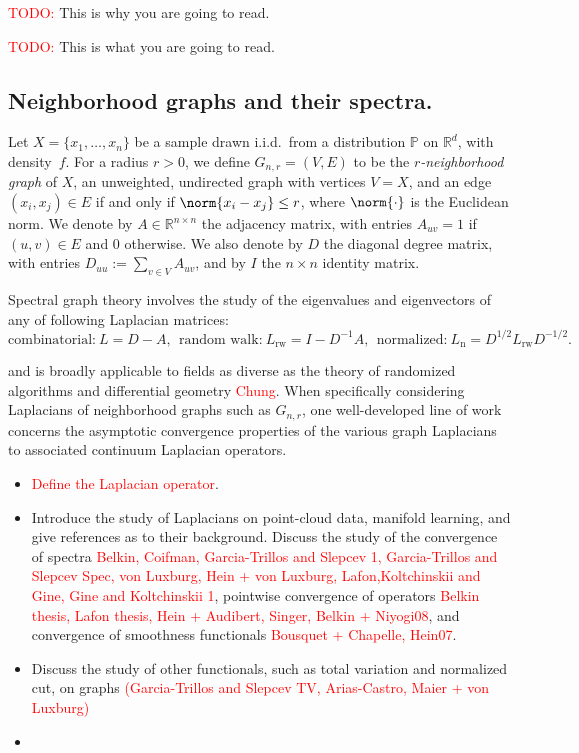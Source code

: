 \documentclass{article}
\newcommand{\Reals}{\mathbb{R}}
\newcommand{\1}{\mathbf{1}}
\newcommand{\Rd}{\Reals^d}
\newcommand{\Pbb}{\mathbb{P}}
\theoremstyle{alden}
\theoremstyle{aldenthm}
\theoremstyle{definition}
\theoremstyle{remark}
\begin{document}
\textcolor{red}{TODO:} This is why you are going to read.

\textcolor{red}{TODO:} This is what you are going to read.

\subsection{Neighborhood graphs and their spectra.}
\label{subsec:neighborhood_graphs_spectra}

Let $X = \{x_1,
\ldots, x_n\}$ be a sample drawn i.i.d.\ from a distribution $\Pbb$ on $\Rd$,
with density~$f$.  For a radius $r > 0$, we define $G_{n,r}=(V,E)$ to be the
\emph{$r$-neighborhood graph} of $X$, an unweighted, undirected graph with
vertices $V=X$, and an edge $(x_i,x_j) \in E$ if and only if $\norm{x_i -
	x_j} \leq r$, where $\norm{\cdot}$ is the Euclidean norm. We denote by $A \in
\Reals^{n \times n}$ the adjacency matrix, with entries $A_{uv} = 1$ if
$(u,v) \in E$ and $0$ otherwise.  We also denote by $D$ the diagonal degree
matrix, with entries $D_{uu} := \sum_{v \in V} A_{uv}$, and by $I$ the $n
\times n$ identity matrix.

Spectral graph theory involves the study of the eigenvalues and eigenvectors of any of following Laplacian matrices:
\begin{equation*}
\textrm{combinatorial:}~ L = D - A,~~ \textrm{random walk:}~ L_{\textrm{rw}} = I - D^{-1}A,~~ \textrm{normalized:}~ L_{\textrm{n}} = D^{1/2}L_{\textrm{rw}}D^{-1/2}.
\end{equation*}

and is broadly applicable to fields as diverse as the theory of randomized algorithms and differential geometry \textcolor{red}{Chung}. When specifically considering Laplacians of neighborhood graphs such as $G_{n,r}$, one well-developed line of work concerns the asymptotic convergence properties of the various graph Laplacians to associated continuum Laplacian operators.  

\begin{itemize}
	\item  \textcolor{red}{Define the Laplacian operator}.
	\item Introduce the study of Laplacians on point-cloud data, manifold learning, and give references as to their background. Discuss the study of the convergence of spectra \textcolor{red}{Belkin, Coifman, Garcia-Trillos and Slepcev 1, Garcia-Trillos and Slepcev Spec, von Luxburg, Hein + von Luxburg, Lafon,Koltchinskii and Gine, Gine and Koltchinskii 1}, pointwise convergence of operators \textcolor{red}{Belkin thesis, Lafon thesis, Hein + Audibert, Singer, Belkin + Niyogi08}, and convergence of smoothness functionals \textcolor{red}{Bousquet + Chapelle, Hein07}. 
	\item Discuss the study of other functionals, such as total variation and normalized cut, on graphs \textcolor{red}{(Garcia-Trillos and Slepcev TV, Arias-Castro, Maier + von Luxburg)}
	\item 
\end{itemize}
\end{document}
